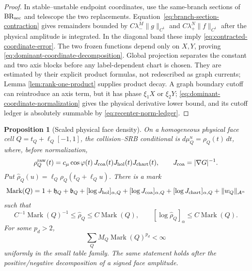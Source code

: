 \documentclass[11pt]{article}
\newtheorem{proposition}[theorem]{Proposition}
\begin{document}
\begin{proof}
In stable--unstable endpoint coordinates, use the same-branch sections of
$\mathrm{BR}_{\rm sec}$ and telescope the two replacements.
Equation~\eqref{eq:branch-section-contraction} gives remainders bounded by
$C\lambda_-^M\|g\|_{C^1}$ and $C\lambda_+^N\|f\|_{C^1}$ after the physical
amplitude is integrated.  In the diagonal band these imply
\eqref{eq:contracted-coordinate-error}.  The two frozen functions depend
only on $X,Y$, proving \eqref{eq:dominant-coordinate-decomposition}.  Global
projection separates the constant and two axis blocks before any
label-dependent chart is chosen.  They are estimated by their explicit
product formulas, not redescribed as graph currents; Lemma
\ref{lem:rank-one-product} supplies product decay.  A graph boundary
cutoff can reintroduce an axis term, but it has phase $\xi_1X$ or $\xi_2Y$;
\eqref{eq:dominant-coordinate-normalization} gives the physical derivative
lower bound, and its cutoff ledger is absolutely summable by
\eqref{eq:recenter-norm-ledger}.
\end{proof}

\begin{proposition}[Scaled physical face density]
\label{prop:scaled-face-density}
On a homogeneous physical face cell
\(Q=t_Q+\ell_Q[-1,1]\), the collision--SRB conditional is
\(d\mu_Q^u=\rho_Q(t)\,dt\), where, before normalization,
\begin{equation}
\label{eq:face-conditional-density}
 \rho_Q^{\rm raw}(t)=c_\mu\cos\varphi(t)\,J_{\rm coa}(t)
 J_{\rm hol}(t)J_{\rm chart}(t),
 \qquad J_{\rm coa}=|\nabla G|^{-1}.
\end{equation}
Put
\(\widehat\rho_Q(u)=\ell_Q\rho_Q(t_Q+\ell_Qu)\).  There is a mark
\begin{equation}
\label{eq:density-mark-definition}
 \operatorname{Mark}(Q)=
 1+\mathfrak h_Q+\mathfrak b_Q+
 [\log J_{\rm hol}]_{\alpha,Q}
 +[\log J_{\rm coa}]_{\alpha,Q}
 +[\log J_{\rm chart}]_{\alpha,Q}
 +\|w_Q\|_{\mathcal A^\alpha}
\end{equation}
such that
\begin{equation}
\label{eq:scaled-density-bound}
 C^{-1}\operatorname{Mark}(Q)^{-1}
 \le\widehat\rho_Q\le C\operatorname{Mark}(Q),\qquad
 [\log\widehat\rho_Q]_\alpha
 \le C\operatorname{Mark}(Q).
\end{equation}
For some \(p_d>2\),
\begin{equation}
\label{eq:density-mark-moment}
 \sum_Q M_Q\operatorname{Mark}(Q)^{p_d}<\infty
\end{equation}
uniformly in the small table family.  The same statement holds after the
positive/negative decomposition of a signed face amplitude.
\end{proposition}
\end{document}
